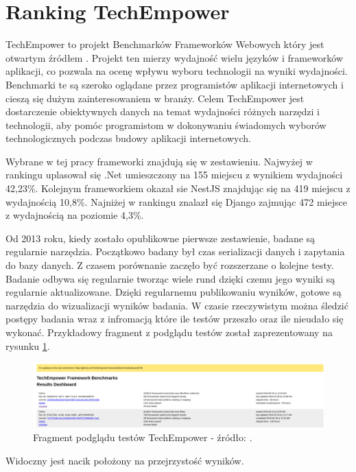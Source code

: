 \section{Ranking TechEmpower}

TechEmpower to projekt Benchmarków Frameworków Webowych który jest otwartym źródłem \cite{techempower}.
Projekt ten mierzy wydajność wielu języków i frameworków aplikacji, co pozwala na ocenę wpływu wyboru technologii na wyniki wydajności.
Benchmarki te są szeroko oglądane przez programistów aplikacji internetowych i cieszą się dużym zainteresowaniem w branży.
Celem TechEmpower jest dostarczenie obiektywnych danych na temat wydajności różnych narzędzi i technologii, aby pomóc programistom w dokonywaniu świadomych wyborów technologicznych podczas budowy aplikacji internetowych.

Wybrane w tej pracy frameworki znajdują się w zestawieniu.
Najwyżej w rankingu uplasował się .Net umieszczony na 155 miejscu z wynikiem wydajności 42,23\%.
Kolejnym frameworkiem okazał sie NestJS znajdując się na 419 miejscu z wydajnością 10,8\%.
Najniżej w rankingu znalazł się Django zajmując 472 miejsce z wydajnością na poziomie 4,3\%. 

Od 2013 roku, kiedy zostało opublikowne pierwsze zestawienie, badane są regularnie narzędzia.
Początkowo badany był czas serializacji danych i zapytania do bazy danych.
Z czasem porównanie zaczęło być rozszerzane o kolejne testy.
Badanie odbywa się regularnie tworząc wiele rund dzięki czemu jego wyniki są regularnie aktualizowane.
Dzięki regularnemu publikowaniu wyników, gotowe są narzędzia do wizualizacji wyników badania.
W czasie rzeczywistym można śledzić postępy badania wraz z infromacją które ile testów przeszło oraz ile nieudało się wykonać.
Przykładowy fragment z podglądu testów został zaprezentowany na rysunku \ref{rys:techempowerdashhboard}.

\begin{figure}[!hb]
	\centering \includegraphics[width=1\linewidth]{rysunki/techempower_result_daschboard.png}
	\caption{Fragment podglądu testów TechEmpower - źródło: \cite{techempower}.}
	\label{rys:techempowerdashhboard}
\end{figure}

Widoczny jest nacik położony na przejrzystość wyników.